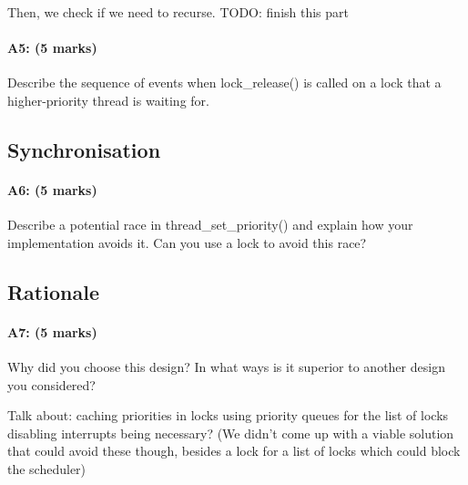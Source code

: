    Then, we check if we need to recurse. TODO: finish this part

\paragraph{A5: (5 marks)}
Describe the sequence of events when lock\_release() is called on a lock that a higher-priority thread is waiting for.

\subsection{Synchronisation}
\paragraph{A6: (5 marks)}
Describe a potential race in thread\_set\_priority() and explain how your implementation avoids it.  Can you use a lock to avoid this race?

\subsection{Rationale}
\paragraph{A7: (5 marks)}
Why did you choose this design?  In what ways is it superior to another design you considered?

Talk about:
	caching priorities in locks
	using priority queues for the list of locks
	disabling interrupts being necessary? (We didn't come up with a viable solution that could avoid these though, besides a lock for a list of locks which could block the scheduler)
